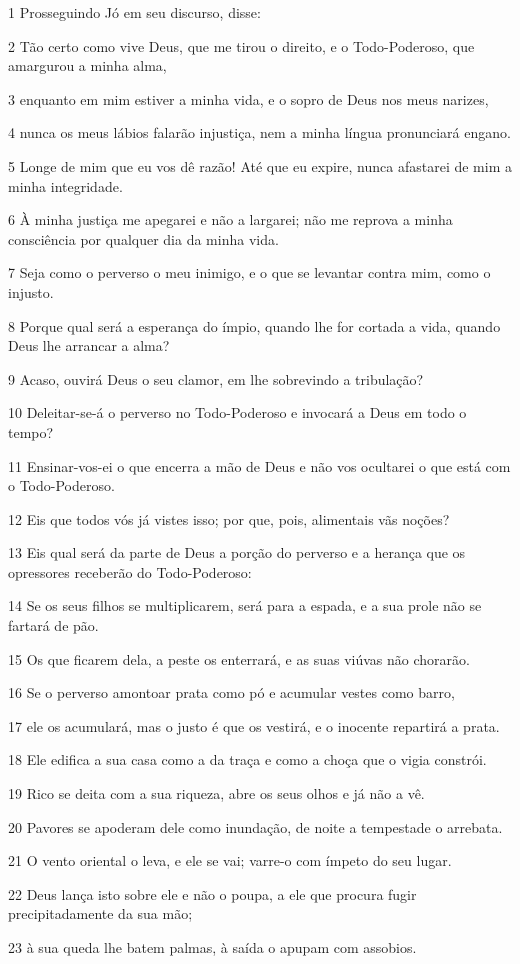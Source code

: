 \par 1 Prosseguindo Jó em seu discurso, disse:
\par 2 Tão certo como vive Deus, que me tirou o direito, e o Todo-Poderoso, que amargurou a minha alma,
\par 3 enquanto em mim estiver a minha vida, e o sopro de Deus nos meus narizes,
\par 4 nunca os meus lábios falarão injustiça, nem a minha língua pronunciará engano.
\par 5 Longe de mim que eu vos dê razão! Até que eu expire, nunca afastarei de mim a minha integridade.
\par 6 À minha justiça me apegarei e não a largarei; não me reprova a minha consciência por qualquer dia da minha vida.
\par 7 Seja como o perverso o meu inimigo, e o que se levantar contra mim, como o injusto.
\par 8 Porque qual será a esperança do ímpio, quando lhe for cortada a vida, quando Deus lhe arrancar a alma?
\par 9 Acaso, ouvirá Deus o seu clamor, em lhe sobrevindo a tribulação?
\par 10 Deleitar-se-á o perverso no Todo-Poderoso e invocará a Deus em todo o tempo?
\par 11 Ensinar-vos-ei o que encerra a mão de Deus e não vos ocultarei o que está com o Todo-Poderoso.
\par 12 Eis que todos vós já vistes isso; por que, pois, alimentais vãs noções?
\par 13 Eis qual será da parte de Deus a porção do perverso e a herança que os opressores receberão do Todo-Poderoso:
\par 14 Se os seus filhos se multiplicarem, será para a espada, e a sua prole não se fartará de pão.
\par 15 Os que ficarem dela, a peste os enterrará, e as suas viúvas não chorarão.
\par 16 Se o perverso amontoar prata como pó e acumular vestes como barro,
\par 17 ele os acumulará, mas o justo é que os vestirá, e o inocente repartirá a prata.
\par 18 Ele edifica a sua casa como a da traça e como a choça que o vigia constrói.
\par 19 Rico se deita com a sua riqueza, abre os seus olhos e já não a vê.
\par 20 Pavores se apoderam dele como inundação, de noite a tempestade o arrebata.
\par 21 O vento oriental o leva, e ele se vai; varre-o com ímpeto do seu lugar.
\par 22 Deus lança isto sobre ele e não o poupa, a ele que procura fugir precipitadamente da sua mão;
\par 23 à sua queda lhe batem palmas, à saída o apupam com assobios.

